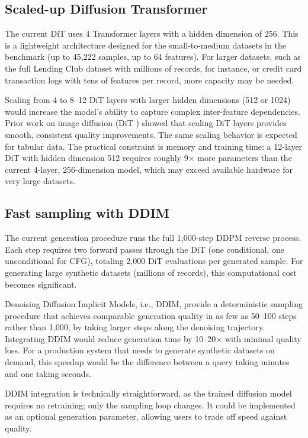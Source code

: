 \subsection{Scaled-up Diffusion Transformer}

The current DiT uses 4 Transformer layers with a hidden dimension of 256. This is a lightweight architecture designed for the small-to-medium datasets in the benchmark (up to 45,222 samples, up to 64 features). For larger datasets, such as the full Lending Club dataset with millions of records, for instance, or credit card transaction logs with tens of features per record, more capacity may be needed.

Scaling from 4 to 8--12 DiT layers with larger hidden dimensions (512 or 1024) would increase the model's ability to capture complex inter-feature dependencies. Prior work on image diffusion (DiT \cite{peebles2023dit}) showed that scaling DiT layers provides smooth, consistent quality improvements. The same scaling behavior is expected for tabular data. The practical constraint is memory and training time: a 12-layer DiT with hidden dimension 512 requires roughly 9$\times$ more parameters than the current 4-layer, 256-dimension model, which may exceed available hardware for very large datasets.

\subsection{Fast sampling with DDIM}

The current generation procedure runs the full 1,000-step DDPM reverse process. Each step requires two forward passes through the DiT (one conditional, one unconditional for CFG), totaling 2,000 DiT evaluations per generated sample. For generating large synthetic datasets (millions of records), this computational cost becomes significant.

Denoising Diffusion Implicit Models, i.e., DDIM, \cite{ho2020ddpm} provide a deterministic sampling procedure that achieves comparable generation quality in as few as 50--100 steps rather than 1,000, by taking larger steps along the denoising trajectory. Integrating DDIM would reduce generation time by 10--20$\times$ with minimal quality loss. For a production system that needs to generate synthetic datasets on demand, this speedup would be the difference between a query taking minutes and one taking seconds.

DDIM integration is technically straightforward, as the trained diffusion model requires no retraining; only the sampling loop changes. It could be implemented as an optional generation parameter, allowing users to trade off speed against quality.


